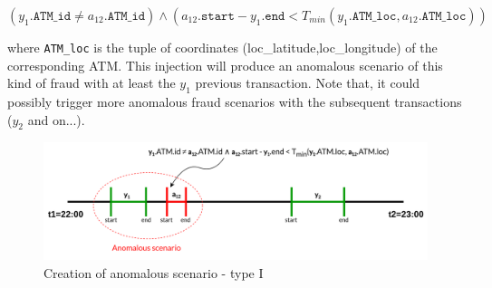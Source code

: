 $$(y_1.\texttt{ATM\_id} \ne a_{12}.\texttt{ATM\_id}) \land (a_{12}.\texttt{start} - 
y_1.\texttt{end} < T_{min}(y_1.\texttt{ATM\_loc}, a_{12}.\texttt{ATM\_loc}))$$

where \texttt{ATM\_loc} is the tuple of coordinates (loc\_latitude,loc\_longitude) of the corresponding ATM. This injection will produce an anomalous scenario of this kind of fraud with at least the $y_1$ previous transaction. Note that, it could possibly trigger more anomalous fraud scenarios with the subsequent transactions ($y_2$ and on...).

\begin{figure}[H]
    \centering
    \includegraphics[width=\textwidth]{images/1-DataModel/tx-generation.png}
    \caption{Creation of anomalous scenario - type I}
    \label{img:anomalous-type-1}
\end{figure}

